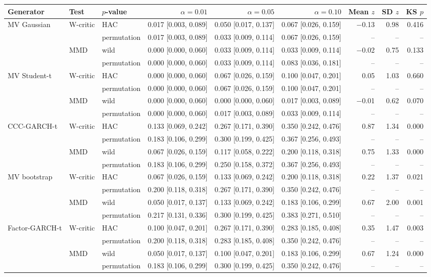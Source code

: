 \begin{tabular}{lllrrrrrr}
\toprule
Generator & Test & $p$-value & $\alpha=0.01$ & $\alpha=0.05$ & $\alpha=0.10$ & Mean $z$ & SD $z$ & KS $p$ \\
\midrule
MV Gaussian & W-critic & HAC & 0.017 [0.003, 0.089] & 0.050 [0.017, 0.137] & 0.067 [0.026, 0.159] & $-$0.13 & 0.98 & 0.416 \\
 &  & permutation & 0.017 [0.003, 0.089] & 0.033 [0.009, 0.114] & 0.067 [0.026, 0.159] & -- & -- & -- \\
 & MMD & wild & 0.000 [0.000, 0.060] & 0.033 [0.009, 0.114] & 0.033 [0.009, 0.114] & $-$0.02 & 0.75 & 0.133 \\
 &  & permutation & 0.000 [0.000, 0.060] & 0.033 [0.009, 0.114] & 0.083 [0.036, 0.181] & -- & -- & -- \\
MV Student-t & W-critic & HAC & 0.000 [0.000, 0.060] & 0.067 [0.026, 0.159] & 0.100 [0.047, 0.201] & 0.05 & 1.03 & 0.660 \\
 &  & permutation & 0.000 [0.000, 0.060] & 0.067 [0.026, 0.159] & 0.100 [0.047, 0.201] & -- & -- & -- \\
 & MMD & wild & 0.000 [0.000, 0.060] & 0.000 [0.000, 0.060] & 0.017 [0.003, 0.089] & $-$0.01 & 0.62 & 0.070 \\
 &  & permutation & 0.000 [0.000, 0.060] & 0.017 [0.003, 0.089] & 0.033 [0.009, 0.114] & -- & -- & -- \\
CCC-GARCH-t & W-critic & HAC & 0.133 [0.069, 0.242] & 0.267 [0.171, 0.390] & 0.350 [0.242, 0.476] & 0.87 & 1.34 & 0.000 \\
 &  & permutation & 0.183 [0.106, 0.299] & 0.300 [0.199, 0.425] & 0.367 [0.256, 0.493] & -- & -- & -- \\
 & MMD & wild & 0.067 [0.026, 0.159] & 0.117 [0.058, 0.222] & 0.200 [0.118, 0.318] & 0.75 & 1.33 & 0.000 \\
 &  & permutation & 0.183 [0.106, 0.299] & 0.250 [0.158, 0.372] & 0.367 [0.256, 0.493] & -- & -- & -- \\
MV bootstrap & W-critic & HAC & 0.067 [0.026, 0.159] & 0.133 [0.069, 0.242] & 0.200 [0.118, 0.318] & 0.22 & 1.37 & 0.021 \\
 &  & permutation & 0.200 [0.118, 0.318] & 0.267 [0.171, 0.390] & 0.350 [0.242, 0.476] & -- & -- & -- \\
 & MMD & wild & 0.050 [0.017, 0.137] & 0.133 [0.069, 0.242] & 0.183 [0.106, 0.299] & 0.67 & 2.00 & 0.001 \\
 &  & permutation & 0.217 [0.131, 0.336] & 0.300 [0.199, 0.425] & 0.383 [0.271, 0.510] & -- & -- & -- \\
Factor-GARCH-t & W-critic & HAC & 0.100 [0.047, 0.201] & 0.267 [0.171, 0.390] & 0.283 [0.185, 0.408] & 0.35 & 1.47 & 0.003 \\
 &  & permutation & 0.200 [0.118, 0.318] & 0.283 [0.185, 0.408] & 0.350 [0.242, 0.476] & -- & -- & -- \\
 & MMD & wild & 0.050 [0.017, 0.137] & 0.100 [0.047, 0.201] & 0.183 [0.106, 0.299] & 0.67 & 1.24 & 0.000 \\
 &  & permutation & 0.183 [0.106, 0.299] & 0.300 [0.199, 0.425] & 0.350 [0.242, 0.476] & -- & -- & -- \\
\bottomrule
\end{tabular}
